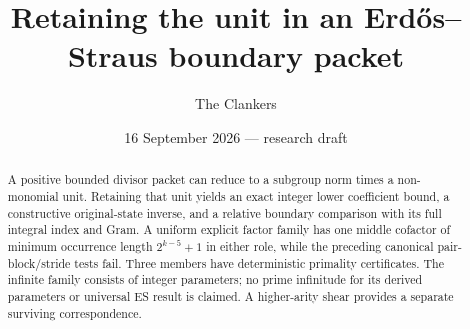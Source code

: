 \documentclass[10pt,a4paper]{article}
\title{Retaining the unit in an Erd\H{o}s--Straus boundary packet}
\author{The Clankers}
\date{16 September 2026 --- research draft}
\begin{document}
\maketitle
\begin{abstract}
A positive bounded divisor packet can reduce to a subgroup norm times a
non-monomial unit. Retaining that unit yields an exact integer lower coefficient
bound, a constructive original-state inverse, and a relative boundary comparison
with its full integral index and Gram. A uniform explicit factor family has
one middle cofactor of minimum occurrence length $2^{k-5}+1$ in either role,
while the preceding canonical pair-block/stride tests fail. Three members have
deterministic primality certificates. The infinite family consists of integer
parameters; no prime infinitude for its derived parameters or universal ES result
is claimed. A higher-arity shear provides a separate surviving correspondence.
\end{abstract}

\begingroup\footnotesize\endgroup
\end{document}
